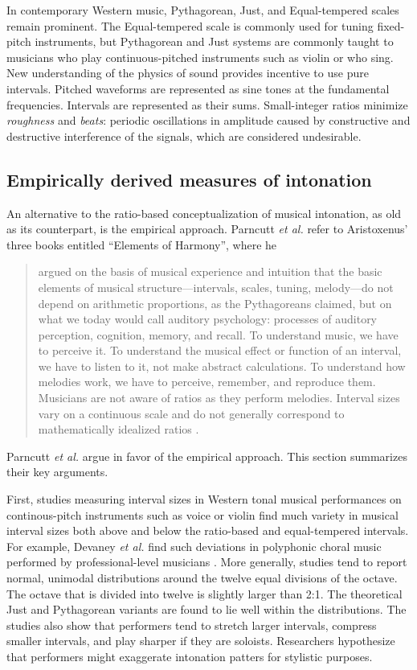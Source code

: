 In contemporary Western music, Pythagorean, Just, and Equal-tempered scales remain prominent. The Equal-tempered scale is commonly used for tuning fixed-pitch instruments, but Pythagorean and Just systems are commonly taught to musicians who play continuous-pitched instruments such as violin or who sing. New understanding of the physics of sound provides incentive to use pure intervals. Pitched waveforms are represented as sine tones at the fundamental frequencies. Intervals are represented as their sums. Small-integer ratios minimize \textit{roughness} and \textit{beats}: periodic oscillations in amplitude caused by constructive and destructive interference of the signals, which are considered undesirable.

\subsection{Empirically derived measures of intonation}
\label{sec:empirical}
An alternative to the ratio-based conceptualization of musical intonation, as old as its counterpart, is the empirical approach. Parncutt \textit{et al.} refer to Aristoxenus' three books entitled ``Elements of Harmony'', where he \begin{quotation}argued on the basis of musical experience and intuition that the basic elements of musical structure---intervals, scales, tuning, melody---do not depend on arithmetic proportions, as the Pythagoreans claimed, but on what we today would call auditory psychology: processes of auditory perception, cognition, memory, and recall. To understand music, we have to perceive it. To understand the musical effect or function of an interval, we have to listen to it, not make abstract calculations. To understand how melodies work, we have to perceive, remember, and reproduce them. Musicians are not aware of ratios as they perform melodies. Interval sizes vary on a continuous scale and do not generally correspond to mathematically idealized ratios \cite[][p.~475]{parncutt2018psychocultural}.\end{quotation} 

Parncutt \textit{et al.} argue in favor of the empirical approach. This section summarizes their key arguments.

First, studies measuring interval sizes in Western tonal musical performances on continous-pitch instruments such as voice or violin find much variety in musical interval sizes both above and below the ratio-based and equal-tempered intervals. For example, Devaney \textit{et al.} find such deviations in polyphonic choral music performed by professional-level musicians \cite{devaney2011intonation}. More generally, studies tend to report normal, unimodal distributions around the twelve equal divisions of the octave. The octave that is divided into twelve is slightly larger than 2:1. The theoretical Just and Pythagorean variants are found to lie well within the distributions. The studies also show that performers tend to stretch larger intervals, compress smaller intervals, and play sharper if they are soloists. Researchers hypothesize that performers might exaggerate intonation patters for stylistic purposes. 

